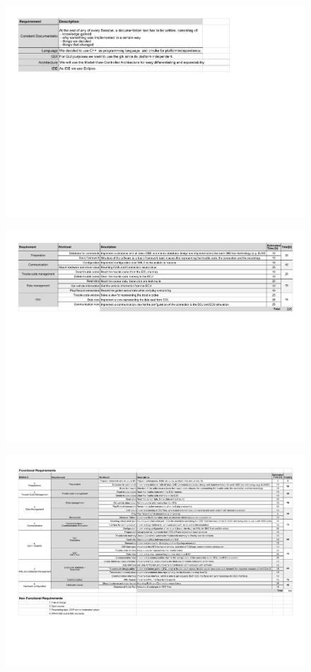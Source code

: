 \begin{landscape}
\begin{figure}[h!]
 \includegraphics[width=\paperwidth]{externaldocuments/Requirements_OBDTool-ACQ13_Project_Requirements.pdf} 
\end{figure}
\end{landscape}
\begin{landscape}
\begin{figure}[h!]
 \includegraphics[width=\paperwidth]{externaldocuments/Requirements_OBDTool-ENG1_Requirements_Elicitation.pdf} 
\end{figure}
\end{landscape}
\begin{landscape}
\begin{figure}[h!]
 \includegraphics[width=\paperwidth]{externaldocuments/Requirements-Software_Requirements.pdf}
\end{figure}
\end{landscape}

